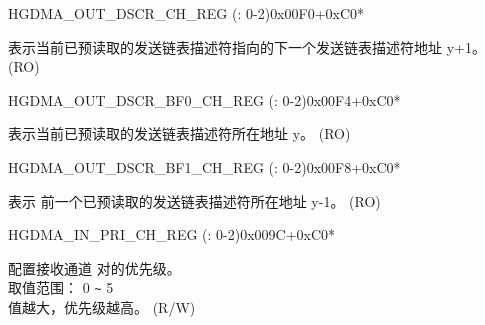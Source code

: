 \begin{register}{H}{GDMA\_OUT\_DSCR\_CH\_REG (: 0-2)}{0x00F0+0xC0*}\label{regdesc:GDMAOUTDSCRCHNREG}
%
\regnewline%
\begin{regdesc}\begin{reglist}
\label{fielddesc:GDMAOUTLINKDSCRCHN}\item [GDMA\_OUTLINK\_DSCR\_CH\regindex{n}] 表示当前已预读取的发送链表描述符指向的下一个发送链表描述符地址 y+1。 (RO)
\end{reglist}\end{regdesc}
\end{register}


\begin{register}{H}{GDMA\_OUT\_DSCR\_BF0\_CH\_REG (: 0-2)}{0x00F4+0xC0*}\label{regdesc:GDMAOUTDSCRBF0CHNREG}
%
\regnewline%
\begin{regdesc}\begin{reglist}
\label{fielddesc:GDMAOUTLINKDSCRBF0CHN}\item [GDMA\_OUTLINK\_DSCR\_BF0\_CH\regindex{n}] 表示当前已预读取的发送链表描述符所在地址 y。 (RO)
\end{reglist}\end{regdesc}
\end{register}


\begin{register}{H}{GDMA\_OUT\_DSCR\_BF1\_CH\_REG (: 0-2)}{0x00F8+0xC0*}\label{regdesc:GDMAOUTDSCRBF1CHNREG}
%
\regnewline%
\begin{regdesc}\begin{reglist}
\label{fielddesc:GDMAOUTLINKDSCRBF1CHN}\item [GDMA\_OUTLINK\_DSCR\_BF1\_CH\regindex{n}] 表示 前一个已预读取的发送链表描述符所在地址 y-1。 (RO)
\end{reglist}\end{regdesc}
\end{register}


\begin{register}{H}{GDMA\_IN\_PRI\_CH\_REG (: 0-2)}{0x009C+0xC0*}\label{regdesc:GDMAINPRICHNREG}
%
%
\regnewline%
\begin{regdesc}\begin{reglist}
\label{fielddesc:GDMARXPRICHN}\item [GDMA\_RX\_PRI\_CH\regindex{n}] 配置接收通道  对的优先级。\\
取值范围： 0 \verb+~+ 5\\
值越大，优先级越高。 (R/W)
\end{reglist}\end{regdesc}
\end{register}


